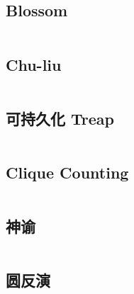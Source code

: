 \documentclass[titlepage, a4paper]{article}
\begin{document}
\begin{multicols}{2}
\begin{spacing}{0.6}
			\subsection*{Blossom}
				\inputminted[fontsize=\small]{cpp}{src/TreeandGraph/Blossom.cpp}
			\subsection*{Chu-liu}
				\inputminted[fontsize=\small]{cpp}{src/TreeandGraph/最小树形图.cpp}
			\subsection*{可持久化 Treap}
				\inputminted[fontsize=\small]{cpp}{src/DataStructure/可持久化treap-zmc.cpp}
			\subsection*{Clique Counting}
			\inputminted[fontsize=\small]{cpp}{src/yzh/clique.cpp}
			\subsection*{神谕}
				\inputminted{cpp}{src/zjj/zjj.cpp}
				
			\newcolumn
			\subsection*{圆反演}
				\inputminted{cpp}{src/yzh/circle_inversion.cpp}

		\end{spacing}
		\endgroup
	\end{multicols}
	
\end{document}
